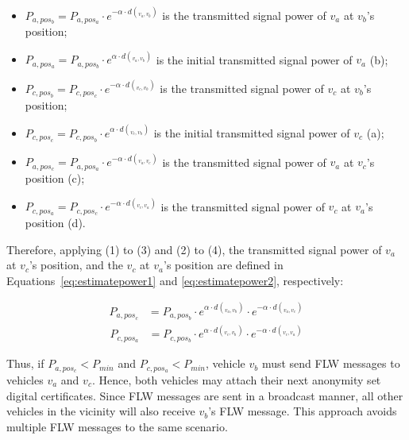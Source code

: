 \documentclass[preprint,12pt]{elsarticle}
\begin{document}
\begin{itemize}
  \item $P_{a, pos_b} = P_{a, pos_a}\cdot e^{- \alpha \cdot d(_{v_a, v_b})}$ is the transmitted signal power of $v_a$ at $v_b$'s position;
  \item $P_{a, pos_a} = P_{a, pos_b}\cdot e^{\alpha \cdot d(_{v_a, v_b})}$ is the initial transmitted signal power of $v_{a}$ (b);
  \item $P_{c, pos_b} = P_{c, pos_c}\cdot e^{- \alpha \cdot d(_{v_c, v_b})}$ is the transmitted signal power of $v_c$ at $v_b$'s position;
  \item $P_{c, pos_c} = P_{c, pos_b}\cdot e^{\alpha \cdot d(_{v_c, v_b})}$ is the initial transmitted signal power of $v_{c}$ (a);
  \item $P_{a, pos_c} = P_{a, pos_a}\cdot e^{- \alpha \cdot d(_{v_a, v_c})}$ is the transmitted signal power of $v_a$ at $v_c$'s position (c);

  \item $P_{c, pos_a} = P_{c, pos_c}\cdot e^{- \alpha \cdot d(_{v_c, v_a})}$ is the transmitted signal power of $v_c$ at $v_a$'s position (d).
\end{itemize}

Therefore, applying (1) to (3) and (2) to (4), the transmitted signal power of $v_a$ at $v_c$'s position, and the $v_c$ at $v_a$'s position are defined in Equations~\ref{eq:estimatepower1} and \ref{eq:estimatepower2}, respectively:

\begin{equation}
\label{eq:estimatepower1}
\begin{split}
P_{a, pos_c} & = P_{a, pos_b}\cdot e^{\alpha \cdot d(_{v_a, v_b})} \cdot e^{- \alpha \cdot d(_{v_a, v_c})}
\end{split}
\end{equation}
\begin{equation}
\label{eq:estimatepower2}
\begin{split}
P_{c, pos_a} & = P_{c, pos_b}\cdot e^{\alpha \cdot d(_{v_c, v_b})} \cdot e^{- \alpha \cdot d(_{v_c, v_a})}
\end{split}
\end{equation}

Thus, if $P_{a, pos_c} < P_{min}$ and $P_{c, pos_a} < P_{min}$, vehicle $v_b$ must send FLW messages to vehicles $v_a$ and $v_c$. Hence, both vehicles may attach their next anonymity set digital certificates. Since FLW messages are sent in a broadcast manner, all other vehicles in the vicinity will also receive $v_b$'s FLW message. This approach avoids multiple FLW messages to the same scenario.
\end{document}
